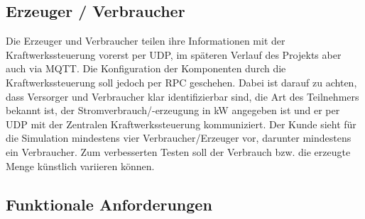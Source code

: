 \documentclass[
    fontsize=12pt,
    parskip=half
]{scrartcl}
\begin{document}
\subsection{Erzeuger / Verbraucher}
Die Erzeuger und Verbraucher teilen ihre Informationen mit der Kraftwerkssteuerung vorerst per UDP, im späteren Verlauf des Projekts aber auch via MQTT.
Die Konfiguration der Komponenten durch die Kraftwerkssteuerung soll jedoch per RPC geschehen.
Dabei ist darauf zu achten, dass Versorger und Verbraucher klar identifizierbar sind, die Art des Teilnehmers bekannt ist, der Stromverbrauch/-erzeugung in kW angegeben ist und er per UDP mit der Zentralen Kraftwerkssteuerung kommuniziert. 
Der Kunde sieht für die Simulation mindestens vier Verbraucher/Erzeuger vor, darunter mindestens ein Verbraucher. 
Zum verbesserten Testen soll der Verbrauch bzw. die erzeugte Menge  künstlich variieren können.



\subsection{Funktionale Anforderungen}
\end{document}
